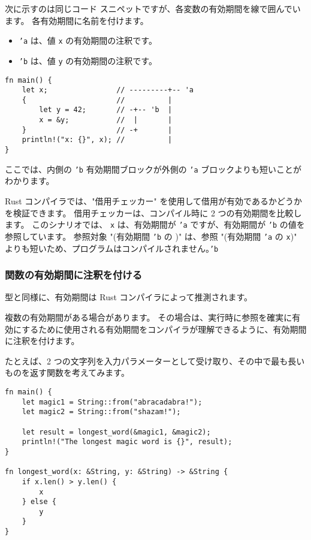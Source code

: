 次に示すのは同じコード スニペットですが、各変数の有効期間を線で囲んでいます。 各有効期間に名前を付けます。

\begin{itemize}
\item \texttt{'a} は、値 \texttt{x} の有効期間の注釈です。
\item \texttt{'b} は、値 \texttt{y} の有効期間の注釈です。
\end{itemize}

\begin{lstlisting}[numbers=none]
fn main() {
    let x;                // ---------+-- 'a
    {                     //          |
        let y = 42;       // -+-- 'b  |
        x = &y;           //  |       |
    }                     // -+       |
    println!("x: {}", x); //          |
}
\end{lstlisting}

ここでは、内側の \texttt{'b} 有効期間ブロックが外側の \texttt{'a} ブロックよりも短いことがわかります。

Rust コンパイラでは、"借用チェッカー" を使用して借用が有効であるかどうかを検証できます。 借用チェッカーは、コンパイル時に 2 つの有効期間を比較します。 このシナリオでは、 \texttt{x} は、有効期間が \texttt{'a} ですが、有効期間が \texttt{'b} の値を参照しています。 参照対象 "(有効期間 \texttt{'b} の )" は、参照 "(有効期間 \texttt{'a} の \texttt{x})" よりも短いため、プログラムはコンパイルされません。\texttt{'b}

\subsubsection{関数の有効期間に注釈を付ける}

型と同様に、有効期間は Rust コンパイラによって推測されます。

複数の有効期間がある場合があります。 その場合は、実行時に参照を確実に有効にするために使用される有効期間をコンパイラが理解できるように、有効期間に注釈を付けます。

たとえば、2 つの文字列を入力パラメーターとして受け取り、その中で最も長いものを返す関数を考えてみます。

\begin{lstlisting}[numbers=none]
fn main() {
    let magic1 = String::from("abracadabra!");
    let magic2 = String::from("shazam!");

    let result = longest_word(&magic1, &magic2);
    println!("The longest magic word is {}", result);
}

fn longest_word(x: &String, y: &String) -> &String {
    if x.len() > y.len() {
        x
    } else {
        y
    }
}
\end{lstlisting}

